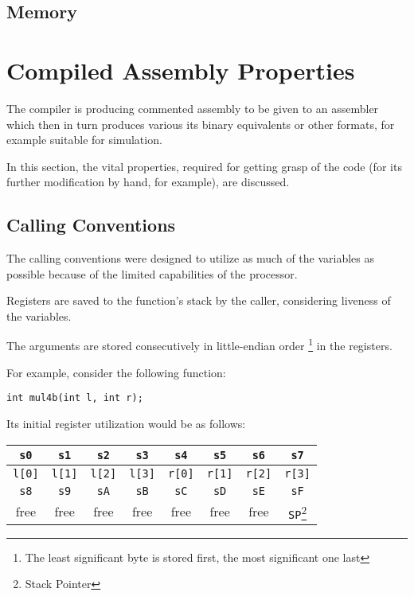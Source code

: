         \subsection{Memory}

    \section{Compiled Assembly Properties}

    The compiler is producing commented assembly to be given to an assembler which then in turn produces various its binary equivalents or other formats, for example suitable for simulation.

    In this section, the vital properties, required for getting grasp of the code (for its further modification by hand, for example), are discussed.

        \subsection{Calling Conventions}

        The calling conventions were designed to utilize as much of the variables as possible because of the limited capabilities of the processor.

        Registers are saved to the function's stack by the caller, considering liveness of the variables.

        The arguments are stored consecutively in little-endian order \footnote{The least significant byte is stored first, the most significant one last} in the registers.

        For example, consider the following function:

        \begin{center}
            \texttt{int mul4b(int l, int r);}
        \end{center}

        Its initial register utilization would be as follows:

        \begin{center}\begin{tabular}{ | c | c | c | c | c | c | c | c | }
            \hline
            \texttt{s0} & \texttt{s1} & \texttt{s2} & \texttt{s3} & \texttt{s4} & \texttt{s5} & \texttt{s6} & \texttt{s7} \\
            \hline
            \texttt{l[0]} & \texttt{l[1]} & \texttt{l[2]} & \texttt{l[3]} & \texttt{r[0]} & \texttt{r[1]} & \texttt{r[2]} & \texttt{r[3]} \\
            \hline
            \hline
            \texttt{s8} & \texttt{s9} & \texttt{sA} & \texttt{sB} & \texttt{sC} & \texttt{sD} & \texttt{sE} & \texttt{sF} \\
            \hline
            free & free & free & free & free & free & free & \texttt{SP}\footnote{Stack Pointer} \\
            \hline
        \end{tabular}\end{center}

